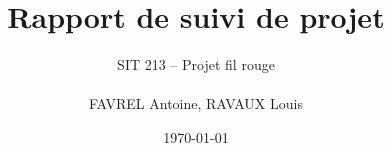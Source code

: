 \documentclass[11pt]{article}
\title{Rapport de suivi de projet}
\author{SIT 213 -- Projet fil rouge \\\\ FAVREL Antoine, RAVAUX Louis}
\date{\today}
\begin{document}
\maketitle	
\pagebreak

\tableofcontents
\pagebreak




\pagebreak




\end{document}
